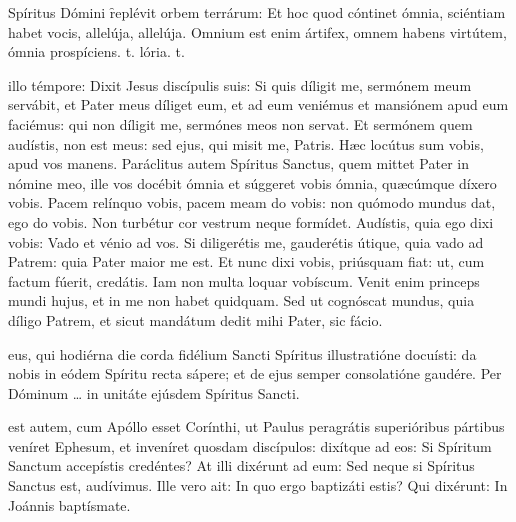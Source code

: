 \documentclass[fontsize=9pt,paper=A6,twoside,BCOR=1mm,DIV=22,headinclude]{scrarticle}
\begin{document}
\begin{multicols}{2}
\R Spíritus Dómini \f replévit orbem terrárum:
\red{*} Et hoc quod cóntinet ómnia, sciéntiam habet vocis, allelúja, allelúja.
\V Omnium est enim ártifex, omnem habens virtútem, ómnia prospíciens.
t.
lória.
t.

 illo témpore: Dixit Jesus discípulis suis: Si quis díligit me, sermónem meum servábit, et Pater meus díliget eum, et ad eum veniémus et mansiónem apud eum faciémus: qui non díligit me, sermónes meos non servat. Et sermónem quem audístis, non est meus: sed ejus, qui misit me, Patris. Hæc locútus sum vobis, apud vos manens. Paráclitus autem Spíritus Sanctus, quem mittet Pater in nómine meo, ille vos docébit ómnia et súggeret vobis ómnia, quæcúmque díxero vobis. Pacem relínquo vobis, pacem meam do vobis: non quómodo mundus dat, ego do vobis. Non turbétur cor vestrum neque formídet. Audístis, quia ego dixi vobis: Vado et vénio ad vos. Si diligerétis me, gauderétis útique, quia vado ad Patrem: quia Pater maior me est. Et nunc dixi vobis, priúsquam fiat: ut, cum factum fúerit, credátis. Iam non multa loquar vobíscum. Venit enim princeps mundi hujus, et in me non habet quidquam. Sed ut cognóscat mundus, quia díligo Patrem, et sicut mandátum dedit mihi Pater, sic fácio.

\columnbreak
{}
eus, qui hodiérna die corda fidélium Sancti Spíritus illustratióne docuísti: da nobis in eódem Spíritu recta sápere; et de ejus semper consolatióne gaudére. Per Dóminum … in unitáte ejúsdem Spíritus Sancti.




 est autem, cum Apóllo esset Corínthi, ut Paulus peragrátis superióribus pártibus veníret Ephesum, et inveníret quosdam discípulos: dixítque ad eos: Si Spíritum Sanctum accepístis credéntes? At illi dixérunt ad eum: Sed neque si Spíritus Sanctus est, audívimus. Ille vero ait: In quo ergo baptizáti estis? Qui dixérunt: In Joánnis baptísmate. 


\end{multicols}
\end{document}
